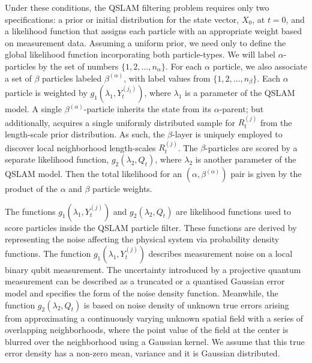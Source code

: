 \documentclass[reprint,longbibliography]{revtex4-1} %
\begin{document}
Under these conditions, the QSLAM filtering problem requires only two specifications: a prior or initial distribution for the state vector, $X_0$, at $t=0$, and a likelihood function that assigns each particle with an appropriate weight based on measurement data. Assuming a uniform prior, we need only to define the global likelihood function incorporating both particle-types. We will label $\alpha$-particles by the set of numbers $\{1, 2, \hdots, n_\alpha\}$. For each $\alpha$ particle, we also associate a set of $\beta$ particles labeled $\beta^{(\alpha)}$, with label values from $\{1, 2, \hdots, n_\beta \}$.  Each  $\alpha$ particle is weighted by $ g_1(\lambda_1, Y_t^{(j_t)})$, where $\lambda_1$ is a parameter of the QSLAM model. A single $\beta^{(\alpha)}$-particle inherits the state from its $\alpha$-parent; but additionally, acquires a single uniformly distributed sample for $R_t^{(j)}$ from the length-scale prior distribution. As such, the $\beta$-layer is uniquely employed to discover local neighborhood length-scales $R_t^{(j)}$. The $\beta$-particles are scored by a separate likelihood function, $g_2(\lambda_2, Q_t)$, where $\lambda_2$ is another parameter of the QSLAM model. Then the total likelihood for an $(\alpha, \beta^{(\alpha)})$ pair is given by the product of the $\alpha$ and $\beta$ particle weights.

The functions $g_1(\lambda_1, Y_t^{(j)})$ and $g_2(\lambda_2, Q_t)$ are likelihood functions used to score particles inside the QSLAM particle filter. These functions are  derived by representing the noise affecting the physical system via probability density functions. The function $g_1(\lambda_1, Y_t^{(j)})$ describes measurement noise on a local binary qubit measurement. The uncertainty introduced by a projective quantum measurement can be described as a truncated or a quantised Gaussian error model and specifies the form of the noise density function. Meanwhile, the function $g_2(\lambda_2, Q_t)$ is based on noise density of unknown true errors arising from approximating a continuously varying unknown spatial field with a series of overlapping neighborhoods, where the point value of the field at the center is blurred over the neighborhood using a Gaussian kernel. We assume that this true error density has a non-zero mean, variance and it is Gaussian distributed.  
\end{document}
